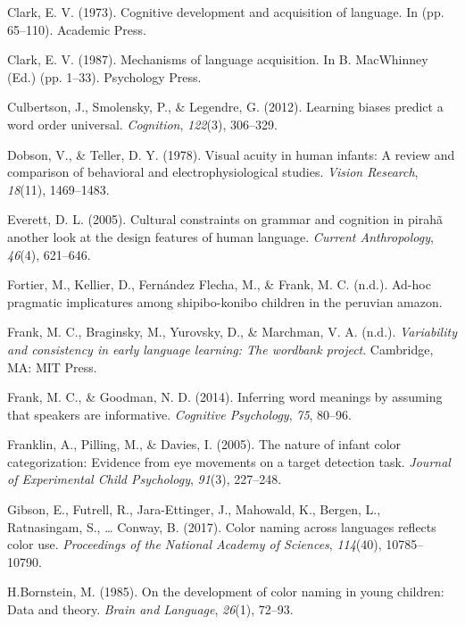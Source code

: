 \documentclass[
  english,
  ,man,floatsintext]{apa6}
\begin{document}
\leavevmode\hypertarget{ref-clark1973}{}%
Clark, E. V. (1973). Cognitive development and acquisition of language. In (pp. 65--110). Academic Press.

\leavevmode\hypertarget{ref-clark1987}{}%
Clark, E. V. (1987). Mechanisms of language acquisition. In B. MacWhinney (Ed.) (pp. 1--33). Psychology Press.

\leavevmode\hypertarget{ref-culbertson2012}{}%
Culbertson, J., Smolensky, P., \& Legendre, G. (2012). Learning biases predict a word order universal. \emph{Cognition}, \emph{122}(3), 306--329.

\leavevmode\hypertarget{ref-dobson1978}{}%
Dobson, V., \& Teller, D. Y. (1978). Visual acuity in human infants: A review and comparison of behavioral and electrophysiological studies. \emph{Vision Research}, \emph{18}(11), 1469--1483.

\leavevmode\hypertarget{ref-everett2005}{}%
Everett, D. L. (2005). Cultural constraints on grammar and cognition in pirahã another look at the design features of human language. \emph{Current Anthropology}, \emph{46}(4), 621--646.

\leavevmode\hypertarget{ref-fortierunderreview}{}%
Fortier, M., Kellier, D., Fernández Flecha, M., \& Frank, M. C. (n.d.). Ad-hoc pragmatic implicatures among shipibo-konibo children in the peruvian amazon.

\leavevmode\hypertarget{ref-frank2020}{}%
Frank, M. C., Braginsky, M., Yurovsky, D., \& Marchman, V. A. (n.d.). \emph{Variability and consistency in early language learning: The wordbank project}. Cambridge, MA: MIT Press.

\leavevmode\hypertarget{ref-frank2014}{}%
Frank, M. C., \& Goodman, N. D. (2014). Inferring word meanings by assuming that speakers are informative. \emph{Cognitive Psychology}, \emph{75}, 80--96.

\leavevmode\hypertarget{ref-franklin2005}{}%
Franklin, A., Pilling, M., \& Davies, I. (2005). The nature of infant color categorization: Evidence from eye movements on a target detection task. \emph{Journal of Experimental Child Psychology}, \emph{91}(3), 227--248.

\leavevmode\hypertarget{ref-gibson2017}{}%
Gibson, E., Futrell, R., Jara-Ettinger, J., Mahowald, K., Bergen, L., Ratnasingam, S., \ldots{} Conway, B. (2017). Color naming across languages reflects color use. \emph{Proceedings of the National Academy of Sciences}, \emph{114}(40), 10785--10790.

\leavevmode\hypertarget{ref-bornstein1985}{}%
H.Bornstein, M. (1985). On the development of color naming in young children: Data and theory. \emph{Brain and Language}, \emph{26}(1), 72--93.
\end{document}
